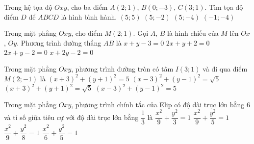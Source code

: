 \begin{ex}%
Trong hệ tọa độ $Oxy$, cho ba điểm $A(2;1)$, $B(0;-3)$, $C(3;1)$. Tìm tọa độ điểm $D$ để $ABCD$ là hình bình hành.
\choice
{\True $(5;5)$}
{$(5;-2)$}
{$(5;-4)$}
{$(-1;-4)$}
\end{ex}

\begin{ex}%
Trong mặt phẳng $Oxy$, cho điểm $M(2;1)$. Gọi $A$, $B$ là hình chiếu của $M$ lên $Ox$, $Oy$. Phương trình đường thẳng $AB$ là
\choice
{$x+y-3=0$}
{$2x+y+2=0$}
{$2x+y-2=0$}
{\True $x+2y-2=0$}
\end{ex}

\begin{ex}%
Trong mặt phẳng $Oxy$, phương trình đường tròn có tâm $I\left(3;1\right)$ và đi qua điểm $M\left(2;-1\right)$ là
\choice
{$\left(x+3\right)^2+\left(y+1\right)^2=5$}
{$\left(x-3\right)^2+\left(y-1\right)^2=\sqrt{5}$}
{$\left(x+3\right)^2+\left(y+1\right)^2=\sqrt{5}$}
{\True $\left(x-3\right)^2+\left(y-1\right)^2=5$}
\end{ex}

\begin{ex}%
Trong mặt phẳng $Oxy$, phương trình chính tắc của Elip có độ dài  trục lớn  bằng $6$ và tỉ số giữa tiêu cự với độ dài trục lớn bằng $\dfrac{1}{3}$ là
\choice
{$\dfrac{x^2}{9}+\dfrac{y^2}{3}=1$}
{$\dfrac{x^2}{9}+\dfrac{y^2}{5}=1$}
{\True $\dfrac{x^2}{9}+\dfrac{y^2}{8}=1$}
{$\dfrac{x^2}{6}+\dfrac{y^2}{5}=1$}
\end{ex}

